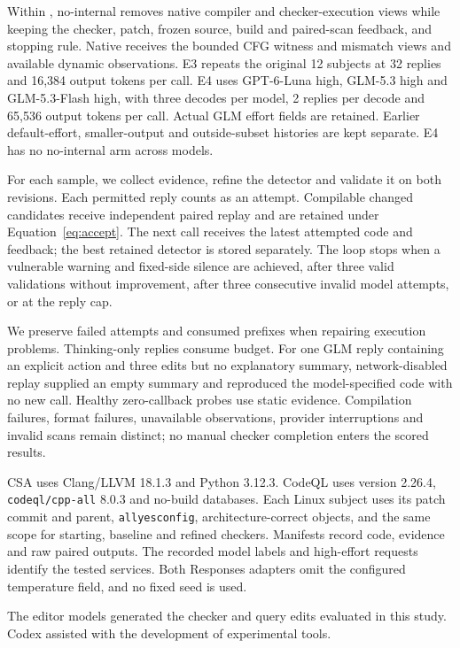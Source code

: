 Within \toolname, no-internal removes native compiler and checker-execution views while keeping the checker, patch, frozen source, build and paired-scan feedback, and stopping rule.
Native receives the bounded CFG witness and mismatch views and available dynamic observations.
E3 repeats the original 12 subjects at 32 replies and 16,384 output tokens per call.
E4 uses GPT-6-Luna high, GLM-5.3 high and GLM-5.3-Flash high, with three decodes per model, 2 replies per decode and 65,536 output tokens per call.
Actual GLM effort fields are retained.
Earlier default-effort, smaller-output and outside-subset histories are kept separate.
E4 has no no-internal arm across models.

For each sample, we collect evidence, refine the detector and validate it on both revisions.
Each permitted reply counts as an attempt.
Compilable changed candidates receive independent paired replay and are retained under Equation~\ref{eq:accept}.
The next call receives the latest attempted code and feedback; the best retained detector is stored separately.
The loop stops when a vulnerable warning and fixed-side silence are achieved, after three valid validations without improvement, after three consecutive invalid model attempts, or at the reply cap.

We preserve failed attempts and consumed prefixes when repairing execution problems.
Thinking-only replies consume budget.
For one GLM reply containing an explicit action and three edits but no explanatory summary, network-disabled replay supplied an empty summary and reproduced the model-specified code with no new call.
Healthy zero-callback probes use static evidence.
Compilation failures, format failures, unavailable observations, provider interruptions and invalid scans remain distinct; no manual checker completion enters the scored results.

CSA uses Clang/LLVM 18.1.3 and Python 3.12.3.
CodeQL uses version 2.26.4, \texttt{codeql/cpp-all} 8.0.3 and no-build databases.
Each Linux subject uses its patch commit and parent, \texttt{allyesconfig}, architecture-correct objects, and the same scope for starting, baseline and refined checkers.
Manifests record code, evidence and raw paired outputs.
The recorded model labels and high-effort requests identify the tested services.
Both Responses adapters omit the configured temperature field, and no fixed seed is used.

The editor models generated the checker and query edits evaluated in this study.
Codex assisted with the development of experimental tools.

